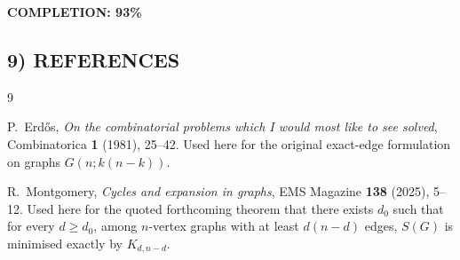 \textbf{COMPLETION: 93\%}

\subsection*{9) REFERENCES}

\begin{thebibliography}{9}

P.~Erd\H{o}s,
\emph{On the combinatorial problems which I would most like to see solved},
Combinatorica \textbf{1} (1981), 25--42.
Used here for the original exact-edge formulation on graphs $G(n; k(n-k))$.

R.~Montgomery,
\emph{Cycles and expansion in graphs},
EMS Magazine \textbf{138} (2025), 5--12.
Used here for the quoted forthcoming theorem that there exists $d_0$ such that for every $d\ge d_0$, among $n$-vertex graphs with at least $d(n-d)$ edges, $S(G)$ is minimised exactly by $K_{d,n-d}$.

\end{thebibliography}
